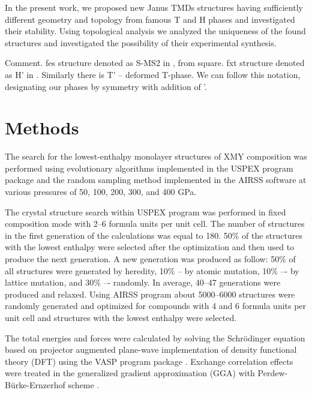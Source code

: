 \documentclass[a4paperm]{article}
\begin{document}
In the present work, we proposed new Janus TMDs structures having sufficiently different geometry and topology from famous T and H phases and investigated their stability. Using topological analysis we analyzed the uniqueness of the found structures and investigated the possibility of their experimental synthesis.


Comment. 
fes structure denoted as S-MS2 in \cite{tang2021_smose}, from square.
fxt structure denoted as H' in \cite{ma2016_h'}.
Similarly there is T' – deformed T-phase.
We can follow this notation, designating our phases by symmetry with addition of '.

		\section{Methods}
The search for the lowest-enthalpy monolayer structures of XMY composition was performed using evolutionary algorithms implemented in the USPEX program package \cite{uspex1,uspex2,uspex3} and the random sampling method implemented in the AIRSS software \cite{airss1,airss2} at various pressures of 50, 100, 200, 300, and 400 GPa.


The crystal structure search within USPEX program was performed in fixed composition mode with 2--6 formula units per unit cell.
The number of structures in the first generation of the calculations was equal to 180.
50\% of the structures with the lowest enthalpy were selected after the optimization and then used to produce the next generation.
A new generation was produced as follow: 50\% of all structures were generated by heredity, 10\% -- by atomic mutation, 10\% –- by lattice mutation, and 30\% –- randomly.
In average, 40--47 generations were produced and relaxed.
Using AIRSS program about 5000--6000 structures were randomly generated and optimized for compounds with 4 and 6 formula units per unit cell and structures with the lowest enthalpy were selected.

The total energies and forces were calculated by solving the Schr\"{o}dinger equation based on projector augmented plane-wave implementation \cite{blochl1994projector} of density functional theory (DFT) using the VASP program package \cite{vasp1,vasp2}.
Exchange correlation effects were treated in the generalized gradient approximation (GGA) with Perdew-B\"{u}rke-Ernzerhof scheme \cite{pbe}.
\end{document}
